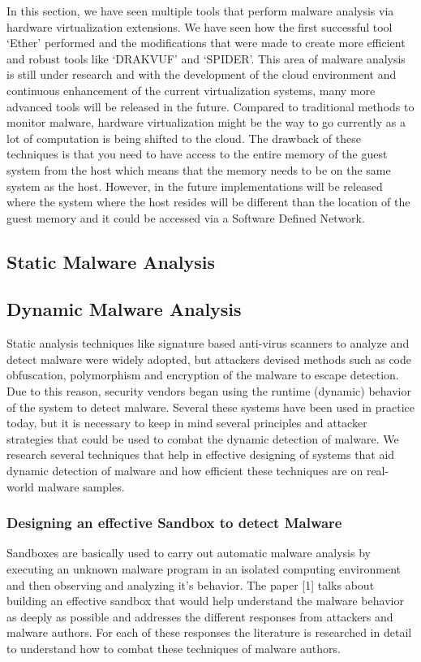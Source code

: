 \documentclass[11pt]{article}
\begin{document}
	In this section, we have seen multiple tools that perform malware analysis via hardware virtualization extensions. We have seen how the first successful tool ‘Ether’ performed and the modifications that were made to create more efficient and robust tools like ‘DRAKVUF’ and ‘SPIDER’. This area of malware analysis is still under research and with the development of the cloud environment and continuous enhancement of the current virtualization systems, many more advanced tools will be released in the future. Compared to traditional methods to monitor malware, hardware virtualization might be the way to go currently as a lot of computation is being shifted to the cloud. The drawback of these techniques is that you need to have access to the entire memory of the guest system from the host which means that the memory needs to be on the same system as the host. However, in the future implementations will be released where the system where the host resides will be different than the location of the guest memory and it could be accessed via a Software Defined Network.
	
	\subsection{Static Malware Analysis}
	\subsection{Dynamic Malware Analysis}
	Static analysis techniques like signature based anti-virus scanners to analyze and detect malware were widely adopted, but attackers devised methods such as code obfuscation, polymorphism and encryption of the malware to escape detection. Due to this reason, security vendors began using the runtime (dynamic) behavior of the system to detect malware. Several these systems have been used in practice today, but it is necessary to keep in mind several principles and attacker strategies that could be used to combat the dynamic detection of malware. We research several techniques that help in effective designing of systems that aid dynamic detection of malware and how efficient these techniques are on real-world malware samples.
		\subsubsection{Designing an effective Sandbox to detect Malware}
		Sandboxes are basically used to carry out automatic malware analysis by executing an unknown malware program in an isolated computing environment and then observing and analyzing it’s behavior. The paper [1] talks about building an effective sandbox that would help understand the malware behavior as deeply as possible and addresses the different responses from attackers and malware authors. For each of these responses the literature is researched in detail to understand how to combat these techniques of malware authors.
\end{document}

